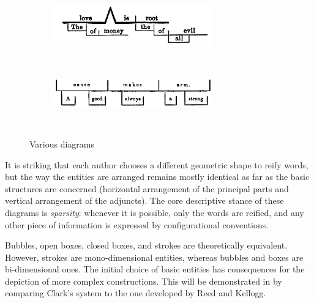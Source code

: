 \documentclass[english,output=paper,colorlinks,citecolor=brown]{../langscibook}
\begin{document}
\begin{figure}
    \begin{subfigure}[t]{\linewidth}\centering
	    \caption{\citealt[265]{Burtt1869}}
	  	\includegraphics[width=0.75\textwidth]{figures/04/Burtt.png}
    \end{subfigure}\medskip\\%
    \begin{subfigure}[t]{\linewidth}\centering
	    \caption{\citealt[153]{Chandler1862}}
	  	\includegraphics[width=0.75\textwidth]{figures/04/Chandler.png}
    \end{subfigure}\medskip\\%
    \begin{subfigure}[t]{\linewidth}\centering
	    \caption{\citealt[50]{Lighthall1872}}
    \end{subfigure}
    \caption{Various diagrams\label{fig:4:4}}
 \end{figure}

It is striking that each author chooses a different geometric shape to reify words, but the way the entities are arranged remains mostly identical as far as the basic structures are concerned (horizontal arrangement of the principal parts and vertical arrangement of the adjuncts). The core descriptive stance of these diagrams is \textit{sparsity}: whenever it is possible, only the words are reified, and any other piece of information is expressed by configurational conventions.

Bubbles, open boxes, closed boxes, and strokes are theoretically equivalent. However, strokes are mono-dimensional entities, whereas bubbles and boxes are bi-dimensional ones. The initial choice of basic entities has consequences for the depiction of more complex constructions. This will be demonstrated in  by comparing Clark’s system to the one developed by Reed and Kellogg.
\end{document}
